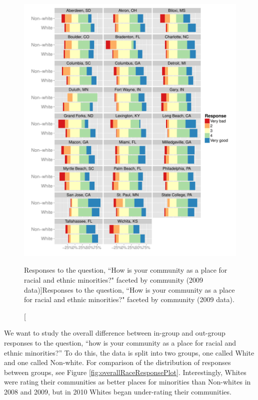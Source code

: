 \documentclass[smallextended]{svjour3}\usepackage[]{graphicx}\usepackage[]{color}
\newenvironment{knitrout}{}{} %
\begin{document}
\begin{knitrout}
\color{fgcolor}\begin{figure}

{\centering \includegraphics[width=0.99\linewidth]{figure/allMinorities-1} 

}

\caption[Responses to the question, ``How is your community as a place for racial and ethnic minorities?" faceted by community (2009 data)]{Responses to the question, ``How is your community as a place for racial and ethnic minorities?" faceted by community (2009 data).}\label{fig:allMinorities}
\end{figure}


\end{knitrout}

We want to study the overall difference between in-group and out-group responses to the question, ``how is your community as a place for racial and ethnic minorities?'' To do this, the data is split into two groups, one called White and one called Non-white. For comparison of the distribution of responses between groups, see Figure \ref{fig:overallRaceResponsePlot}. Interestingly, Whites were rating their communities as better places for minorities than Non-whites in 2008 and 2009, but in 2010 Whites began under-rating their communities. 
\end{document}
